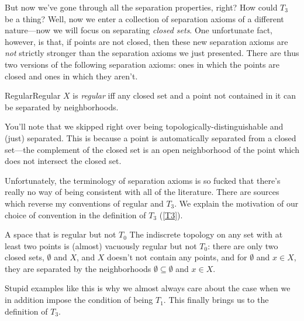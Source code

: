 But now we've gone through all the separation properties, right?  How could $T_3$ be a thing?  Well, now we enter a collection of separation axioms of a different nature---now we will focus on separating \emph{closed sets}.  One unfortunate fact, however, is that, if points are not closed, then these new separation axioms are \emph{not} strictly stronger than the separation axioms we just presented.  There are thus two versions of the following separation axioms:  ones in which the points are closed and ones in which they aren't.
\begin{dfn}{Regular}{Regular}
$X$ is \emph{regular} iff any closed set and a point not contained in it can be separated by neighborhoods.
\begin{rmk}
You'll note that we skipped right over being topologically-distinguishable and (just) separated.  This is because a point is automatically separated from a closed set---the complement of the closed set is an open neighborhood of the point which does not intersect the closed set.
\end{rmk}
\begin{rmk}
Unfortunately, the terminology of separation axioms is so fucked that there's really no way of being consistent with all of the literature.  There are sources which reverse my conventions of regular and $T_3$.  We explain the motivation of our choice of convention in the definition of $T_3$ (\cref{T3}).
\end{rmk}
\end{dfn}
\begin{exm}{A space that is regular but not $T_0$}{}
The indiscrete topology on any set with at least two points is (almost) vacuously regular but not $T_0$:  there are only two closed sets, $\emptyset$ and $X$, and $X$ doesn't not contain any points, and for $\emptyset$ and $x\in X$, they are separated by the neighborhoods $\emptyset \subseteq \emptyset$ and $x\in X$.
\end{exm}
Stupid examples like this is why we almost always care about the case when we in addition impose the condition of being $T_1$.  This finally brings us to the definition of $T_3$.

